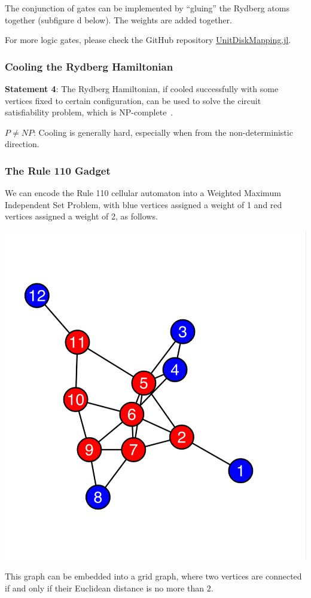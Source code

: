 \documentclass[twocolumn,superscriptaddress,english,showpacs,longbibliography]{revtex4-2}
\begin{document}
The conjunction of gates can be implemented by ``gluing'' the Rydberg
atoms together (subfigure d below). The weights are added together.

For more logic gates, please check the GitHub repository
\href{https://github.com/QuEraComputing/UnitDiskMapping.jl/blob/main/test/logicgates.jl}{UnitDiskMapping.jl}.

\subsubsection{Cooling the Rydberg Hamiltonian}\label{cooling-the-rydberg-hamiltonian}

\textbf{Statement 4}: The Rydberg Hamiltonian, if cooled successfully
with some vertices fixed to certain configuration, can be used to solve
the circuit satisfiability problem, which is NP-complete~\cite{Moore2011}.

$P \neq NP$: Cooling is generally hard, especially when from the
non-deterministic direction.

\subsubsection{The Rule 110 Gadget}\label{the-rule-110-gadget}

We can encode the Rule 110 cellular automaton into a Weighted Maximum
Independent Set Problem, with blue vertices assigned a weight of 1 and
red vertices assigned a weight of 2, as follows.

\includegraphics[width=0.6\columnwidth]{../notes/images/image.png}

This graph can be embedded into a grid graph, where two vertices are
connected if and only if their Euclidean distance is no more than $2$.
\end{document}
